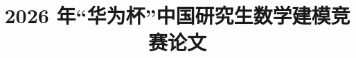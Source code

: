 \documentclass[bwprint]{template/gmcmthesis}
\title{2026 年“华为杯”中国研究生数学建模竞赛论文}
\begin{document}
\maketitle
\begin{abstract}

\end{abstract}
\pagestyle{plain}










\end{document}
